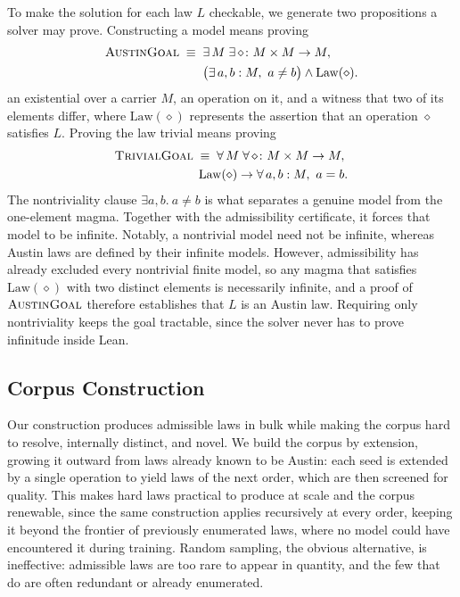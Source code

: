 \documentclass[letterpaper]{article} %
\newcommand{\op}{\diamond}
\begin{document}
To make the solution for each law $L$ checkable, we generate two
propositions a solver may prove. Constructing a model means proving
\[
  \begin{aligned}
    \textsc{AustinGoal} \;\equiv\;{}& \exists\, M\; \exists\, {\op}\colon M \times M \to M,\\
    & \bigl(\exists\, a, b : M,\ a \neq b\bigr) \wedge \mathrm{Law}(\op).
  \end{aligned}
\]
 an existential over a carrier $M$, an operation on it, and a witness that two of its elements differ, where $\mathrm{Law}(\op)$ represents the assertion that an operation $\op$ satisfies $L$. Proving the law trivial means proving
\[
\begin{aligned}
      \textsc{TrivialGoal} \;\equiv\; \forall\, M\; \forall\, {\op}\colon M \times M \to M,\; \\
  \mathrm{Law}(\op) \rightarrow \forall\, a, b : M,\ a = b.
\end{aligned}
\]
The nontriviality clause $\exists a, b.\ a \neq b$ is what separates a genuine model from the one-element magma. Together with the admissibility certificate, it forces that
model to be infinite. Notably, a nontrivial model need not be infinite, whereas Austin laws are defined by their infinite models. However, admissibility has already excluded every nontrivial finite model, so any magma that satisfies $\mathrm{Law}(\op)$ with two distinct elements is necessarily infinite, and a proof of $\textsc{AustinGoal}$ therefore establishes that $L$ is an Austin law. Requiring only nontriviality keeps the goal tractable, since the solver never has to prove infinitude inside Lean.


\subsection{Corpus Construction}
Our construction produces admissible laws in bulk while making the corpus hard to resolve, internally distinct, and novel. We build the corpus by extension, growing it outward from laws already known to be Austin: each seed is extended by a single operation to yield laws of the next order, which are then screened for quality. This makes hard laws practical to produce at scale and the corpus renewable, since the same construction applies recursively at every order, keeping it beyond the frontier of previously enumerated laws, where no model could have encountered it during training. Random sampling, the obvious alternative, is ineffective: admissible laws are too rare to appear in quantity, and the few that do are often redundant or already enumerated.
\end{document}
